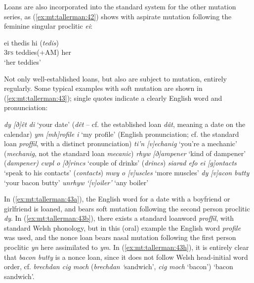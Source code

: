 \documentclass[output=paper,colorlinks,citecolor=brown]{langscibook}
\begin{document}
{Loans are also incorporated into the standard system for the other mutation series, as (\ref{ex:mt:tallerman:42}) shows with aspirate mutation following the feminine singular proclitic} {\textit{ei}}{:}

\ea\label{ex:mt:tallerman:42}
\gll ei thedis    hi    (\textit{tedis})\\
\textsc{3fs} teddies(+AM) her\\
\glt ‘her teddies’
\z

Not only well-established loans, but also  are subject to mutation, entirely regularly. Some typical examples with soft mutation are shown in (\ref{ex:mt:tallerman:43}); single quotes indicate a clearly English word and pronunciation:

\ea\label{ex:mt:tallerman:43}                        
\ea\label{ex:mt:tallerman:43a}
\textit{dy [ð]êt di}    ‘your date’  (\textit{dêt}{ – cf. the established loan} {\textit{dât}}{, meaning}   a date on the calendar)
\ex\label{ex:mt:tallerman:43b}
\textit{ym [mh]rofile i} ‘my profile’ (English pronunciation; cf. the standard loan {\textit{proffil}}{, with a distinct pronunciation)}
\ex\label{ex:mt:tallerman:43c}
\textit{ti’n [v]echanig} ‘you’re a mechanic’ (\textit{mechanig}{, not the standard loan} \textit{mecanic})
\ex\label{ex:mt:tallerman:43d}
\textit{rhyw [ð]ampener} ‘kind of dampener’ (\textit{dampener)}
\ex\label{ex:mt:tallerman:43e}
\textit{cwpl o [ð]rincs} ‘couple of drinks’ (\textit{drincs}) 
\ex\label{ex:mt:tallerman:43f}
\textit{siarad efo ei [g]ontacts} ‘speak to his contacts’ (\textit{contacts})
\ex\label{ex:mt:tallerman:43g}
\textit{mwy o [v]uscles} ‘more muscles’
\ex\label{ex:mt:tallerman:43h}
\textit{dy [v]acon butty} ‘your bacon butty’
\ex\label{ex:mt:tallerman:43i}
\textit{unrhyw}\textit{ ‘[v]oiler’} ‘any boiler’
\z
\z

{In (\ref{ex:mt:tallerman:43a}), the English word for a date with a boyfriend or girlfriend is loaned, and bears soft mutation following the second person proclitic} {\textit{dy}}. In (\ref{ex:mt:tallerman:43b}), there exists a standard loanword {\textit{proffil}}{, with standard Welsh phonology, but in this (oral) example the English word} {\textit{profile}}{ was used, and the nonce loan bears nasal mutation following the first person proclitic} {\textit{yn}} here assimilated to {\textit{ym}}{. In (\ref{ex:mt:tallerman:43h}), it is entirely clear that} {\textit{bacon butty} }{is a nonce loan, since it does not follow Welsh head-initial word order, cf.} {\textit{brechdan cig moch}}{ (}{\textit{brechdan ‘}}{sandwich’,} {\textit{cig moch}}{ ‘bacon’) ‘bacon sandwich’.} 
\end{document}

